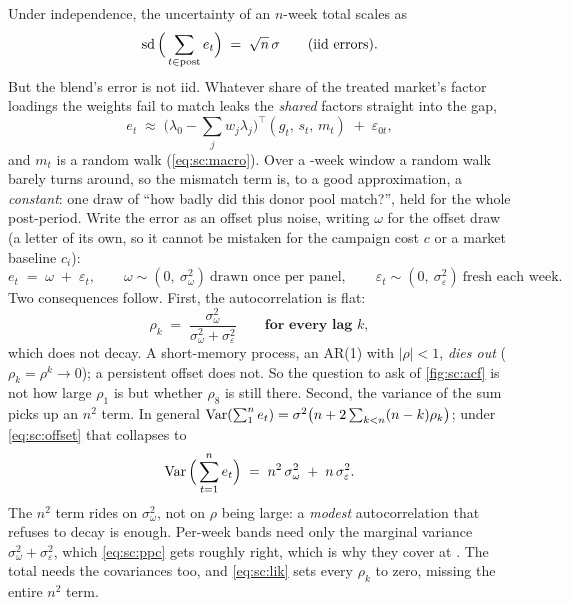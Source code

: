 Under independence, the uncertainty of an $n$-week total scales as
%
\begin{equation}
  \operatorname{sd}\Big(\sum_{t \in \text{post}} e_t\Big) \;=\; \sqrt{n}\,\sigma
  \qquad \text{(iid errors)} .
  \label{eq:sc:sqrtn}
\end{equation}
%
But the blend's error is not iid. Whatever share of the treated market's factor loadings the weights
fail to match leaks the \emph{shared} factors straight into the gap,
%
\begin{equation}
  e_t \;\approx\; \big(\lambda_0 - \textstyle\sum_j w_j \lambda_j\big)^{\!\top}
        (g_t,\, s_t,\, m_t) \;+\; \varepsilon_{0t},
  \label{eq:sc:leak}
\end{equation}
%
and $m_t$ is a random walk (\cref{eq:sc:macro}). Over a \nbSevenNPost-week window a random walk
barely turns around, so the mismatch term is, to a good approximation, a \emph{constant}: one
draw of ``how badly did this donor pool match?'', held for the whole post-period. Write the error
as an offset plus noise, writing $\omega$ for the offset draw (a letter of its own, so it cannot be
mistaken for the campaign cost $c$ or a market baseline $c_i$):
%
\begin{equation}
  e_t \;=\; \omega \;+\; \varepsilon_t,
  \qquad \omega \sim (0,\ \sigma_\omega^{2}) \ \text{drawn once per panel},
  \qquad \varepsilon_t \sim (0,\ \sigma_\varepsilon^{2}) \ \text{fresh each week}.
  \label{eq:sc:offset}
\end{equation}
%
Two consequences follow. First, the autocorrelation is flat:
%
\begin{equation}
  \rho_k \;=\; \frac{\sigma_\omega^{2}}{\sigma_\omega^{2} + \sigma_\varepsilon^{2}}
  \qquad \textbf{for every lag } k,
  \label{eq:sc:flatrho}
\end{equation}
%
which does not decay. A short-memory process, an AR(1) with $|\rho| < 1$, \emph{dies out}
($\rho_k = \rho^k \to 0$); a persistent offset does not. So the question to ask of \cref{fig:sc:acf}
is not how large $\rho_1$ is but whether $\rho_8$ is still there. Second, the variance of the sum
picks up an $n^{2}$ term. In general
$\operatorname{Var}(\sum_1^n e_t) = \sigma^2\big(n + 2\sum_{k<n}(n-k)\rho_k\big)$; under \cref{eq:sc:offset} that
collapses to
%
\begin{equation}
  \operatorname{Var}\Big(\sum_{t=1}^{n} e_t\Big) \;=\; n^{2}\,\sigma_\omega^{2} \;+\; n\,\sigma_\varepsilon^{2}.
  \label{eq:sc:n2}
\end{equation}
%
The $n^{2}$ term rides on $\sigma_\omega^{2}$, not on $\rho$ being large: a \emph{modest} autocorrelation
that refuses to decay is enough. Per-week bands need only the marginal variance
$\sigma_\omega^{2} + \sigma_\varepsilon^{2}$, which \cref{eq:sc:ppc} gets roughly right, which is why
they cover at \pc{\nbSevenWeekCov}. The total needs the covariances too, and \cref{eq:sc:lik} sets
every $\rho_k$ to zero, missing the entire $n^{2}$ term.

